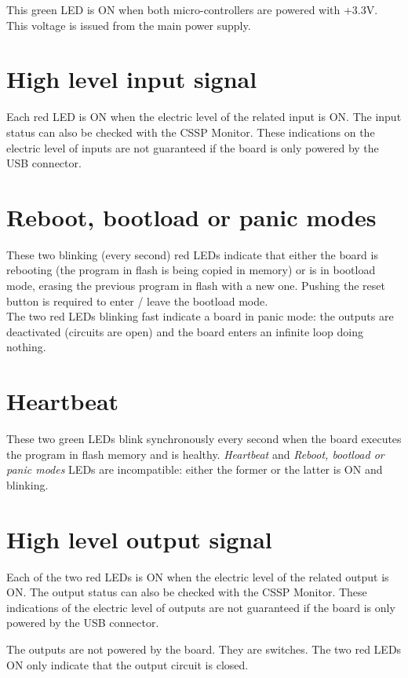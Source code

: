 This green LED is ON when both micro-controllers are powered with +3.3V. This voltage is issued from the main power supply. 

\section{High level input signal}

Each red LED is ON when the electric level of the related input is ON. The input status can also be checked with the CSSP Monitor.
These indications on the electric level of inputs are not guaranteed if the board is only powered by the USB connector.

\section{Reboot, bootload or panic modes}

These two blinking (every second) red LEDs indicate that either the board is rebooting (the program in flash is being copied in memory) or is in bootload mode, erasing the previous program in flash with a new one. Pushing the reset button is required to enter / leave the bootload mode.  \\
The two red LEDs blinking fast indicate a board in panic mode: the outputs are deactivated (circuits are open) and the board enters an infinite loop doing nothing.

\section{Heartbeat}

These two green LEDs blink synchronously every second when the board executes the program in flash memory and is healthy.
\textit{Heartbeat} and \textit{Reboot, bootload or panic modes} LEDs are incompatible: either the former or the latter is ON and blinking.

\section{High level output signal}

Each of the two red LEDs is ON when the electric level of the related output is ON. The output status can also be checked with the CSSP Monitor.
These indications of the electric level of outputs are not guaranteed if the board is only powered by the USB connector.

The outputs are not powered by the board. They are switches. The two red LEDs ON only indicate that the output circuit is closed.

